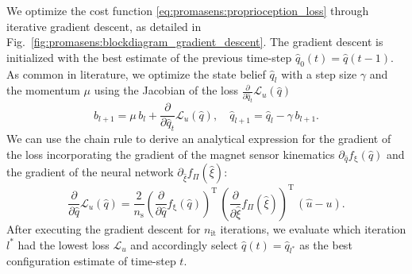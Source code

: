 
We optimize the cost function \eqref{eq:promasens:proprioception_loss} through iterative gradient descent, as detailed in Fig.~\ref{fig:promasens:blockdiagram_gradient_descent}. The gradient descent is initialized with the best estimate of the previous time-step $\hat{q}_0 (t) = \hat{q}(t-1)$.
As common in literature, we optimize the state belief $\hat{q}_l$ with a step size $\gamma$ and the momentum $\mu$ using the Jacobian of the loss $\frac{\partial}{\partial \hat{q}_t} \mathcal{L}_{u}(\hat{q})$
\begin{equation}\label{eq:promasens:gradient_descent}
    b_{l+1} = \mu \, b_l + \frac{\partial}{\partial \hat{q}_t} \mathcal{L}_{u}(\hat{q}), \quad \hat{q}_{l+1} = \hat{q}_l - \gamma \, b_{l+1}.
\end{equation}
We can use the chain rule to derive an analytical expression for the gradient of the loss incorporating the gradient of the magnet sensor kinematics $\partial_{\hat{q}} f_{\mathrm{\xi}}(\hat{q})$ and the gradient of the neural network $\partial_{\hat{\xi}} f_\Pi (\hat{\xi})$:
\begin{equation}
    \frac{\partial}{\partial \hat{q}} \mathcal{L}_{u}(\hat{q}) = \frac{2}{n_\mathrm{s}} \left ( \frac{\partial }{\partial {\hat{q}}} f_{\mathrm{\xi}}(\hat{q}) \right )^\mathrm{T} \, \left ( \frac{\partial}{\partial {\hat{\xi}}} f_\Pi(\hat{\xi}) \right )^\mathrm{T} \, (\hat{u} - u).
\end{equation}
After executing the gradient descent for $n_\mathrm{it}$ iterations, we evaluate which iteration $l^*$ had the lowest loss $\mathcal{L}_{u}$ and accordingly select $\hat{q}(t) = \hat{q}_{l^*}$ as the best configuration estimate of time-step $t$.
